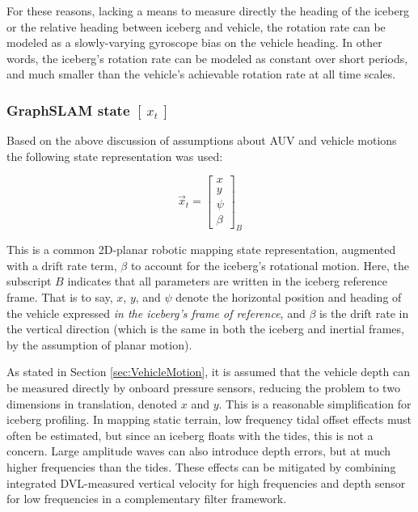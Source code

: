 For these reasons, lacking a means to measure directly the heading of the iceberg or the relative heading between iceberg and vehicle, the rotation rate can be modeled as a slowly-varying gyroscope bias on the vehicle heading. In other words, the iceberg's rotation rate can be modeled as constant over short periods, and much smaller than the vehicle's achievable rotation rate at all time scales.

\subsubsection{GraphSLAM state $\left[~x_t~\right]$}

Based on the above discussion of assumptions about AUV and vehicle motions the following state representation was used:

\begin{equation}
\label{eq.state}
\vec{x}_t= \left[\begin{array}{c}
                     x \\ y \\ \psi \\ \beta 
                     \end{array}\right]_B
\end{equation}

This is a common 2D-planar robotic mapping state representation, augmented with a drift rate term, $\beta$ to account for the iceberg's rotational motion. Here, the subscript $B$ indicates that all parameters are written in the iceberg reference frame. That is to say, $x$, $y$, and $\psi$ denote the horizontal position and heading of the vehicle expressed \emph{in the iceberg's frame of reference}, and $\beta$ is the drift rate in the vertical direction (which is the same in both the iceberg and inertial frames, by the assumption of planar motion). 

As stated in Section \ref{sec:VehicleMotion}, it is assumed that the vehicle depth can be measured directly by onboard pressure sensors, reducing the problem to two dimensions in translation, denoted $x$ and $y$. This is a reasonable simplification for iceberg profiling. In mapping static terrain, low frequency tidal offset effects must often be estimated, but since an iceberg floats with the tides, this is not a concern. Large amplitude waves can also introduce depth errors, but at much higher frequencies than the tides. These effects can be mitigated by combining integrated DVL-measured vertical velocity for high frequencies and depth sensor for low frequencies in a complementary filter framework.

